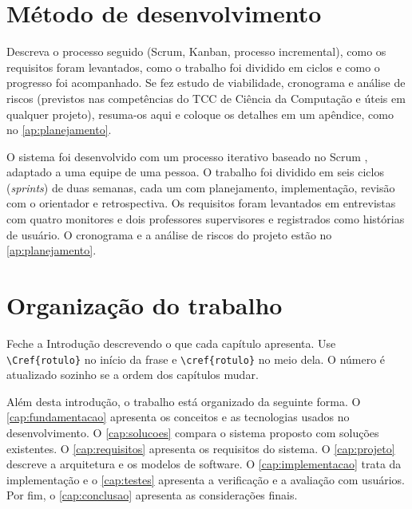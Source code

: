 \section{Método de desenvolvimento}
\label{sec:introducao:metodo}

\begin{instrucao}
Descreva o processo seguido (Scrum, Kanban, processo incremental), como os
requisitos foram levantados, como o trabalho foi dividido em ciclos e como o
progresso foi acompanhado. Se fez estudo de viabilidade, cronograma e análise
de riscos (previstos nas competências do TCC de Ciência da Computação e úteis
em qualquer projeto), resuma-os aqui e coloque os detalhes em um apêndice,
como no \cref{ap:planejamento}.
\end{instrucao}

O sistema foi desenvolvido com um processo iterativo baseado no Scrum
\cite{schwaber2020scrum}, adaptado a uma equipe de uma pessoa. O trabalho foi
dividido em seis ciclos (\emph{sprints}) de duas semanas, cada um com
planejamento, implementação, revisão com o orientador e retrospectiva. Os
requisitos foram levantados em entrevistas com quatro monitores e dois
professores supervisores e registrados como histórias de usuário. O
cronograma e a análise de riscos do projeto estão no \cref{ap:planejamento}.

\section{Organização do trabalho}
\label{sec:introducao:organizacao}

\begin{instrucao}
Feche a Introdução descrevendo o que cada capítulo apresenta. Use
\verb|\Cref{rotulo}| no início da frase e \verb|\cref{rotulo}| no meio dela. O
número é atualizado sozinho se a ordem dos capítulos mudar.
\end{instrucao}

Além desta introdução, o trabalho está organizado da seguinte forma. O
\cref{cap:fundamentacao} apresenta os conceitos e as tecnologias usados no
desenvolvimento. O \cref{cap:solucoes} compara o sistema proposto com
soluções existentes. O \cref{cap:requisitos} apresenta os requisitos do
sistema. O \cref{cap:projeto} descreve a arquitetura e os modelos de
software. O \cref{cap:implementacao} trata da implementação e o
\cref{cap:testes} apresenta a verificação e a avaliação com usuários. Por fim, o \cref{cap:conclusao}
apresenta as considerações finais.

